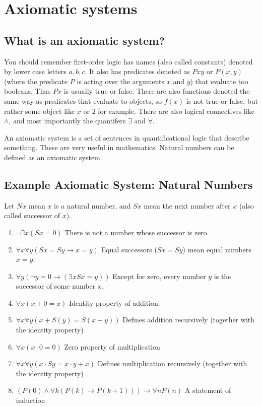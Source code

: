 \documentclass[11pt, letterpaper, twoside, openright]{book}
\begin{document}
\section{Axiomatic systems}
\subsection{What is an axiomatic system?}

You should remember first-order logic has names (also called constants) denoted by lower case letters $a, b, c$. It also has predicates denoted as $Pxy$ or $P(x,y)$ (where the predicate $P$ is acting over the arguments $x$ and $y$) that evaluate too booleans. Thus $Px$ is usually true or false. There are also functions denoted the same way as predicates that evaluate to objects, so $f(x)$ is not true or false, but rather some object like $x$ or $2$ for example. There are also logical connectives like $\wedge$, and most importantly the quantifers $\exists$ and $\forall$.

An axiomatic system is a set of sentences in quantificational logic that describe something. These are very useful in mathematics. Natural numbers can be defined as an axiomatic system.

\subsection{Example Axiomatic System: Natural Numbers}
Let $Nx$ mean $x$ is a natural number, and $Sx$ mean the next number after $x$ (also called successor of $x$).
\begin{enumerate}
\item $\neg \exists x (Sx = 0)$ There is not a number whose successor is zero.
\item $\forall x \forall y (Sx = Sy \rightarrow x = y)$ Equal successors ($Sx = Sy$) mean equal numbers $x = y$.
\item $\forall y (\neg y = 0 \rightarrow (\exists x Sx = y))$ Except for zero, every number $y$ is the successor of some number $x$.
\item $\forall x (x + 0 = x)$ Identity property of addition.
\item $\forall x \forall y (x + S(y) = S(x + y))$ Defines addition recursively (together with the identity property)
\item $\forall x (x \cdot 0 = 0)$ Zero property of multiplication
\item $\forall x \forall y (x \cdot Sy = x \cdot y + x)$ Defines multiplication recursively (together with the identity property)
\item $(P(0) \wedge \forall k (P(k) \rightarrow P(k + 1))) \rightarrow \forall n P(n)$ A statement of induction
\end{enumerate}
\end{document}
